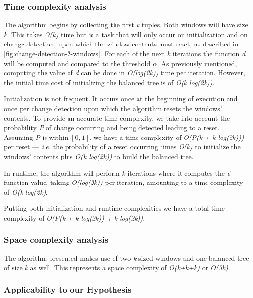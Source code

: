 \subsubsection{Time complexity analysis}
The algorithm begins by collecting the first \textit{k} tuples. Both windows will have size \textit{k}. This takes \textit{O(k)} time but is a task that will only occur on initialization and on change detection, upon which the window contents must reset, as described in \ref{fig:change-detection-2-windows}. For each of the next \textit{k} iterations the function \textit{d} will be computed and compared to the threshold $\alpha$. As previously mentioned, computing the value of \textit{d} can be done in \textit{O(log(2k))} time per iteration. However, the initial time cost of initializing the balanced tree is of \textit{O(k log(2k))}. 

Initialization is not frequent. It occurs once at the beginning of execution and once per change detection upon which the algorithm resets the windows' contents. To provide an accurate time complexity, we take into account the probability \textit{P} of change occurring and being detected leading to a reset. Assuming \textit{P} is within $[0, 1]$, we have a time complexity of \textit{O(P(k + k log(2k)))} per reset --- \textit{i.e.} the probability of a reset occurring times \textit{O(k)} to initialize the windows' contents plus \textit{O(k log(2k))} to build the balanced tree.

In runtime, the algorithm will perform \textit{k} iterations where it computes the \textit{d} function value, taking \textit{O(log(2k))} per iteration, amounting to a time complexity of \textit{O(k log(2k)}.

Putting both initialization and runtime complexities we have a total time complexity of \textit{O(P(k + k log(2k)) + k log(2k))}.

\subsubsection{Space complexity analysis}

The algorithm presented makes use of two \textit{k} sized windows and one balanced tree of size \textit{k} as well. This represents a space complexity of \textit{O(k+k+k)} or \textit{O(3k)}.

\subsubsection{Applicability to our Hypothesis}

